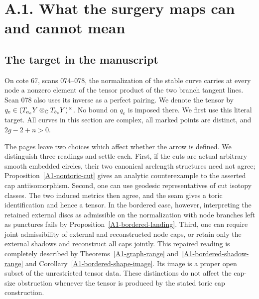 \section{A.1. What the surgery maps can and cannot mean}
\subsection{The target in the manuscript}
On cote 67, scans 074--078, the normalization of the stable curve carries at every node a nonzero element of the tensor product of the two branch tangent lines. Scan 078 also uses its inverse as a perfect pairing. We denote the tensor by $q_e\in(T_{a_e}Y\otimes_{{\mathbb{C}}}T_{b_e}Y)^\times$. No bound on $q_e$ is imposed there. We first use this literal target. All curves in this section are complex, all marked points are distinct, and $2g-2+n>0$.

The pages leave two choices which affect whether the arrow is defined.
We distinguish three readings and settle each. First, if the cuts are
actual arbitrary smooth embedded circles, their two canonical arclength
structures need not agree; Proposition~\ref{A1-nontoric-cut} gives an
analytic counterexample to the asserted cap antiisomorphism. Second,
one can use geodesic representatives of cut isotopy classes. The two
induced metrics then agree, and the seam gives a toric identification
and hence a tensor. In the bordered case, however, interpreting the
retained external discs as admissible on the normalization with node
branches left as punctures fails by
Proposition~\ref{A1-bordered-landing}. Third, one can require joint
admissibility of external and reconstructed node caps, or retain only
the external shadows and reconstruct all caps jointly. This repaired
reading is completely described by
Theorems~\ref{A1-graph-range} and~\ref{A1-bordered-shadow-range}
and Corollary~\ref{A1-bordered-shape-image}. Its image is a proper
open subset of the unrestricted tensor data. These distinctions do
not affect the cap-size obstruction whenever the tensor is produced
by the stated toric cap construction.



